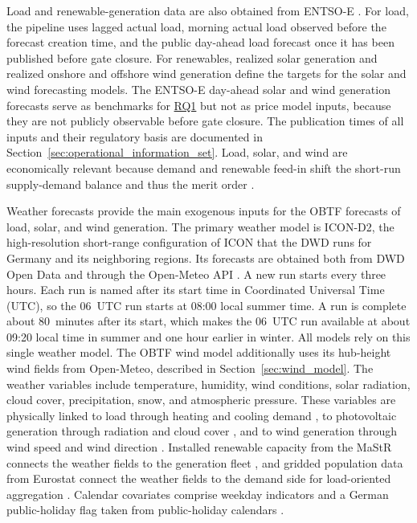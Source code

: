 Load and renewable-generation data are also obtained from \mbox{ENTSO-E}
\cite{entsoeTransparency}. For load, the pipeline uses lagged actual load,
morning actual load observed before the forecast creation time, and the public
day-ahead load forecast once it has been published before gate closure. For
renewables, realized solar generation and realized onshore and offshore wind
generation define the targets for the solar and wind forecasting models. The
\mbox{ENTSO-E} day-ahead solar and wind generation forecasts serve as
benchmarks for \hyperlink{rq:component_forecast_quality}{RQ1} but not
as price model inputs, because they are not publicly observable before gate
closure. The
publication times of all inputs and their regulatory basis are documented in
Section~\ref{sec:operational_information_set}. Load, solar, and wind are
economically relevant because demand and renewable feed-in shift the
short-run supply-demand balance and thus the merit order
\cite{sensfuss2008meritOrder}.

Weather forecasts provide the main exogenous inputs for the OBTF forecasts of
load, solar, and wind generation. The primary weather model is
\mbox{ICON-D2}, the high-resolution short-range configuration of ICON that the DWD
runs for Germany and its neighboring regions. Its forecasts are obtained both from
DWD Open Data and through the Open-Meteo API
\cite{zaengl2015icon,dwdIconForecastData,openMeteoForecastApi}. A new run starts
every three hours. Each run is named after its start time in Coordinated Universal Time (UTC), so the 06~UTC run
starts at 08:00 local summer time. A run is complete about 80~minutes after its
start, which makes the 06~UTC run available at about 09:20 local time in summer
and one hour earlier in winter. All models rely on this single weather model. The OBTF wind model additionally uses its hub-height wind
fields from Open-Meteo, described in Section~\ref{sec:wind_model}. The weather variables include
temperature, humidity, wind conditions, solar radiation, cloud cover,
precipitation, snow, and atmospheric pressure. These variables are physically
linked to load through heating and cooling demand
\cite{hong2016probabilisticLoad}, to photovoltaic generation through radiation
and cloud cover \cite{antonanzas2016pvForecasting}, and to wind generation
through wind speed and wind direction
\cite{foley2012windForecasting}. Installed renewable capacity from the
MaStR connects the weather fields to the generation fleet
\cite{bundesnetzagenturMastr}, and gridded population data from Eurostat
connect the weather fields to the demand side for load-oriented aggregation
\cite{eurostatGisco2021}. Calendar covariates comprise weekday indicators and a
German public-holiday flag taken from public-holiday calendars
\cite{pythonHolidays}.

